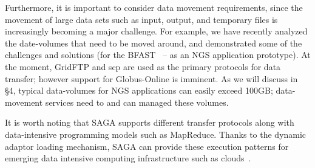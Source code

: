 \documentclass[]{svjour3}
\begin{document}
Furthermore, it is important to consider data movement requirements,
since the movement of large data sets such as input, output, and
temporary files is increasingly becoming a major challenge.  For
example, we have recently analyzed the date-volumes that need to be
moved around, and demonstrated some of the challenges and solutions
(for the BFAST~\cite{dare-ecmls11} -- as an NGS application
prototype).  At the moment, GridFTP and scp are used as the primary
protocols for data transfer; however support for Globus-Online is
imminent. As we will discuss in \S4, typical data-volumes for NGS
applications can easily exceed 100GB; data-movement services need
to and can managed these volumes.


It is worth noting that SAGA supports different transfer protocols
along with data-intensive programming models such as MapReduce.
Thanks to the dynamic adaptor loading mechanism, SAGA can provide
these execution patterns for emerging data intensive computing
infrastructure such as clouds~\cite{bigjob_cloudcom10,saga_bigjob_condor_cloud}.








\end{document}

